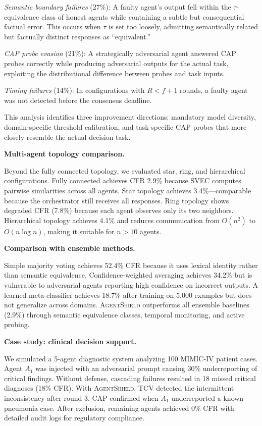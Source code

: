 \documentclass[journal,10pt]{IEEEtran}
\begin{document}
\emph{Semantic boundary failures} (27\%): A faulty agent's output fell within the $\tau$-equivalence class of honest agents while containing a subtle but consequential factual error. This occurs when $\tau$ is set too loosely, admitting semantically related but factually distinct responses as ``equivalent.''

\emph{CAP probe evasion} (21\%): A strategically adversarial agent answered CAP probes correctly while producing adversarial outputs for the actual task, exploiting the distributional difference between probes and task inputs.

\emph{Timing failures} (14\%): In configurations with $R < f+1$ rounds, a faulty agent was not detected before the consensus deadline.

This analysis identifies three improvement directions: mandatory model diversity, domain-specific threshold calibration, and task-specific CAP probes that more closely resemble the actual decision task.

\textbf{Multi-agent topology comparison.}

Beyond the fully connected topology, we evaluated star, ring, and hierarchical configurations. Fully connected achieves CFR 2.9\% because SVEC computes pairwise similarities across all agents. Star topology achieves 3.4\%---comparable because the orchestrator still receives all responses. Ring topology shows degraded CFR (7.8\%) because each agent observes only its two neighbors. Hierarchical topology achieves 4.1\% and reduces communication from $O(n^2)$ to $O(n \log n)$, making it suitable for $n > 10$ agents.

\textbf{Comparison with ensemble methods.}

Simple majority voting achieves 52.4\% CFR because it uses lexical identity rather than semantic equivalence. Confidence-weighted averaging achieves 34.2\% but is vulnerable to adversarial agents reporting high confidence on incorrect outputs. A learned meta-classifier achieves 18.7\% after training on 5{,}000 examples but does not generalize across domains. \textsc{AgentShield} outperforms all ensemble baselines (2.9\%) through semantic equivalence classes, temporal monitoring, and active probing.

\textbf{Case study: clinical decision support.}

We simulated a 5-agent diagnostic system analyzing 100 MIMIC-IV patient cases. Agent $A_1$ was injected with an adversarial prompt causing 30\% underreporting of critical findings. Without defense, cascading failures resulted in 18 missed critical diagnoses (18\% CFR). With \textsc{AgentShield}, TCV detected the intermittent inconsistency after round 3. CAP confirmed when $A_1$ underreported a known pneumonia case. After exclusion, remaining agents achieved 0\% CFR with detailed audit logs for regulatory compliance.
\end{document}
